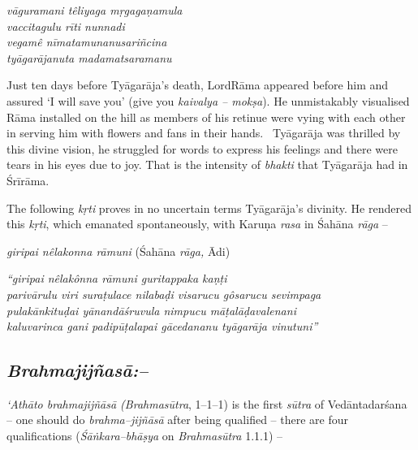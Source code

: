 \begin{myquote}
\textit{vāguramani têliyaga mṛgagaṇamula}\\\textit{vaccitagulu rīti nunnadi}\\\textit{vegamê nīmatamunanusariñcina}\\\textit{tyāgarājanuta madamatsaramanu}
\end{myquote}

Just ten days before Tyāgarāja’s death, LordRāma appeared before him and assured ‘I will save you’ (give you \textit{kaivalya – mokṣa}). He unmistakably visualised Rāma installed on the hill as members of his retinue were vying with each other in serving him with flowers and fans in their hands.  Tyāgarāja was thrilled by this divine vision, he struggled for words to express his feelings and there were tears in his eyes due to joy. That is the intensity of \textit{bhakti} that Tyāgarāja had in Śrīrāma.

The following \textit{kṛti} proves in no uncertain terms Tyāgarāja’s divinity. He rendered this \textit{kṛti}, which emanated spontaneously, with Karuṇa \textit{rasa} in Śahāna \textit{rāga} –

\begin{myquote}
\textit{giripai nêlakonna rāmuni} (Śahāna \textit{rāga,} Ādi)
\end{myquote}

\begin{myquote}
\textit{“giripai nêlakônna rāmuni guritappaka kaṇṭi} \\\textit{parivārulu viri suraṭulace nilabaḍi visarucu gôsarucu sevimpaga}\\\textit{pulakānkituḍai yānandāśruvula nimpucu māṭalāḍavalenani}\\\textit{kaluvarinca gani padipūṭalapai gācedananu tyāgarāja vinutuni”}
\end{myquote}


\subsection*{\textit{Brahmajijñasā:–}}

\textit{‘Athāto brahmajijñāsā (Brahmasūtra}, 1–1–1) is the first \textit{sūtra} of Vedāntadarśana – one should do \textit{brahma–jijñāsā} after being qualified – there are four qualifications (\textit{Śāṅkara–bhāṣya} on \textit{Brahmasūtra} 1.1.1) –

\vspace{-.3cm}

